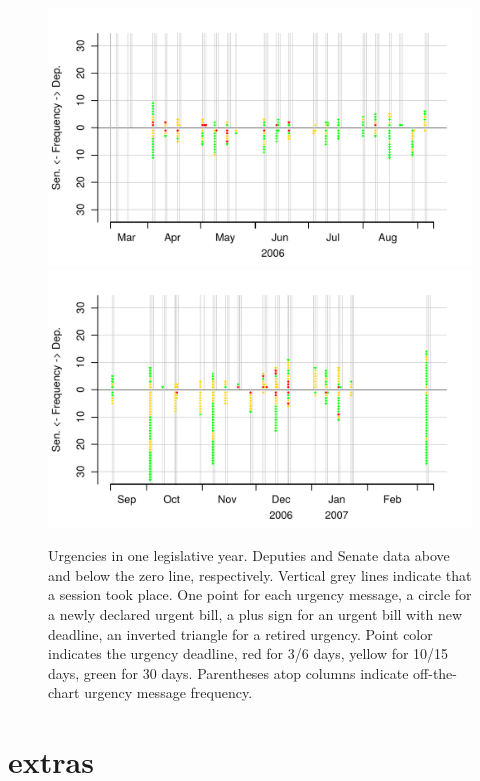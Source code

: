 \documentclass[letter,12pt]{article}
\begin{document}
\begin{figure}
\begin{center}
    \includegraphics[width=\columnwidth]{../graphs/urgencias2006-1.pdf} \\
    \includegraphics[width=\columnwidth]{../graphs/urgencias2006-2.pdf} 
  \caption{Urgencies in one legislative year. Deputies and Senate data above and below the zero line, respectively. Vertical grey lines indicate that a session took place. One point for each urgency message, a circle for a newly declared urgent bill, a plus sign for an urgent bill with new deadline, an inverted triangle for a retired urgency. Point color indicates the urgency deadline, red for 3/6 days, yellow for 10/15 days, green for 30 days. Parentheses atop columns indicate off-the-chart urgency message frequency.}\label{f:depvar}
\end{center}
\end{figure}

\section{extras}
\end{document}

